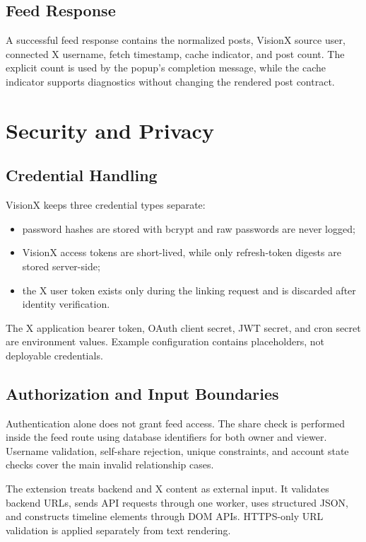 \documentclass[11pt,a4paper]{report}
\begin{document}
\section{Feed Response}
A successful feed response contains the normalized posts, VisionX source user,
connected X username, fetch timestamp, cache indicator, and post count. The
explicit count is used by the popup's completion message, while the cache
indicator supports diagnostics without changing the rendered post contract.

\chapter{Security and Privacy}

\section{Credential Handling}
VisionX keeps three credential types separate:

\begin{itemize}
  \item password hashes are stored with bcrypt and raw passwords are never
  logged;
  \item VisionX access tokens are short-lived, while only refresh-token digests
  are stored server-side;
  \item the X user token exists only during the linking request and is
  discarded after identity verification.
\end{itemize}

The X application bearer token, OAuth client secret, JWT secret, and cron
secret are environment values. Example configuration contains placeholders,
not deployable credentials.

\section{Authorization and Input Boundaries}
Authentication alone does not grant feed access. The share check is performed
inside the feed route using database identifiers for both owner and viewer.
Username validation, self-share rejection, unique constraints, and account
state checks cover the main invalid relationship cases.

The extension treats backend and X content as external input. It validates
backend URLs, sends API requests through one worker, uses structured JSON, and
constructs timeline elements through DOM APIs. HTTPS-only URL validation is
applied separately from text rendering.
\end{document}
